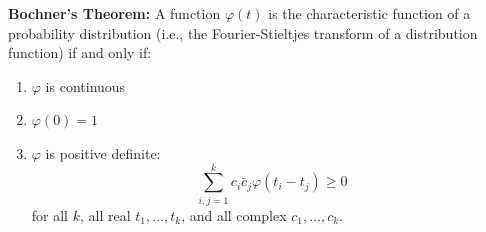 \textbf{Bochner's Theorem:} A function $\varphi(t)$ is the characteristic function of a probability distribution (i.e., the Fourier-Stieltjes transform of a distribution function) if and only if:
\begin{enumerate}
\item $\varphi$ is continuous
\item $\varphi(0) = 1$
\item $\varphi$ is positive definite:
  $$\sum_{i,j=1}^{k} c_i \bar{c}_j \varphi(t_i - t_j) \geq 0$$
  for all $k$, all real $t_1, \ldots, t_k$, and all complex $c_1, \ldots, c_k$.
\end{enumerate}
